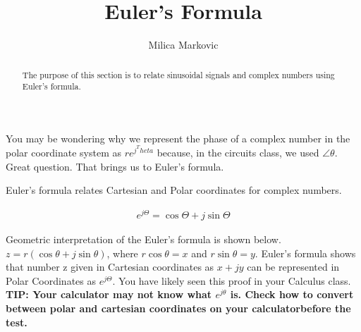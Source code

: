 \documentclass{ximera}
\title{Euler's Formula}
\author{Milica Markovic}
\begin{document}
  
\begin{abstract}  
The purpose of this section is to relate sinusoidal signals and complex numbers using Euler's formula.
\end{abstract}  
\maketitle    
  



You may be wondering why we represent the phase of a complex number in the polar coordinate system as  $r e^{j ^Theta} $ because, in the circuits class, we used $\angle \theta$. Great question. That brings us to Euler's formula.

  
  

 Euler's formula relates Cartesian and Polar coordinates for complex numbers.

\begin{eqnarray}
 e^{j \Theta} =  \cos \Theta + j  \sin \Theta
\end{eqnarray}

Geometric interpretation of the Euler's formula is shown below. $z=r ( \cos{\theta} + j \sin{\theta})$, where $r \cos{\theta}=x$ and $r \sin{\theta}=y$. Euler's formula shows that number z given in Cartesian coordinates as $x+jy$ can be represented in Polar Coordinates as   $e^{j \Theta}$. You have likely seen this proof in your Calculus class.  {\bf TIP: Your calculator may not know what $e^{j\theta}$ is. Check how to convert between polar and cartesian coordinates on your calculatorbefore the test.}
\end{document}
